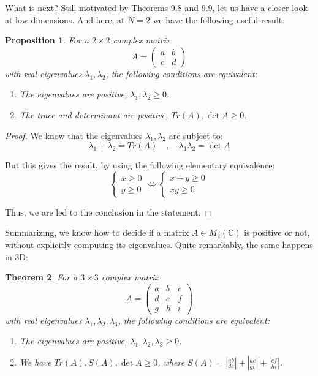 \documentclass[12pt]{amsbook}
\newtheorem{theorem}{Theorem}[chapter]
\newtheorem{proposition}[theorem]{Proposition}
\begin{document}
What is next? Still motivated by Theorems 9.8 and 9.9, let us have a closer look at low dimensions. And here, at $N=2$ we have the following useful result:

\begin{proposition}
For a $2\times2$ complex matrix
$$A=\begin{pmatrix}
a&b\\ c&d\end{pmatrix}$$
with real eigenvalues $\lambda_1,\lambda_2$, the following conditions are equivalent:
\begin{enumerate}
\item The eigenvalues are positive, $\lambda_1,\lambda_2\geq0$.

\item The trace and determinant are positive, $Tr(A),\det A\geq0$.
\end{enumerate}
\end{proposition}

\begin{proof}
We know that the eigenvalues $\lambda_1,\lambda_2$ are subject to:
$$\lambda_1+\lambda_2=Tr(A)\quad,\quad 
\lambda_1\lambda_2=\det A$$

But this gives the result, by using the following elementary equivalence:
$$\begin{cases}x\geq0\\ y\geq0\end{cases}\iff
\begin{cases}x+y\geq0\\ xy\geq0\end{cases}$$

Thus, we are led to the conclusion in the statement.
\end{proof}

Summarizing, we know how to decide if a matrix $A\in M_2(\mathbb C)$ is positive or not, without explicitly computing its eigenvalues. Quite remarkably, the same happens in 3D:

\begin{theorem}
For a $3\times3$ complex matrix
$$A=\begin{pmatrix}
a&b&c\\ d&e&f\\ g&h&i\end{pmatrix}$$
with real eigenvalues $\lambda_1,\lambda_2,\lambda_3$, the following conditions are equivalent:
\begin{enumerate}
\item The eigenvalues are positive, $\lambda_1,\lambda_2,\lambda_3\geq0$.

\item We have $Tr(A),S(A),\det A\geq0$, where $S(A)=|^{ab}_{de}|+|^{ac}_{gi}|+|^{ef}_{hi}|$.
\end{enumerate}
\end{theorem}
\end{document}

